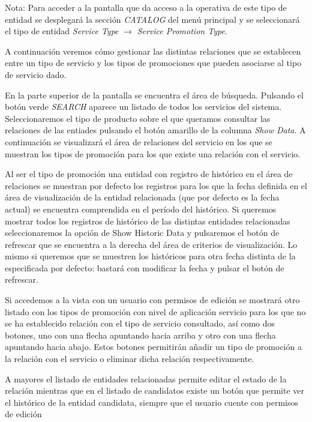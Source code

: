 Nota: Para acceder a la pantalla que da acceso a la operativa de este tipo de entidad se desplegará la sección \emph{CATALOG} del menú principal y se seleccionará el tipo de entidad \emph{Service Type} $\rightarrow$  \emph{Service Promotion Type}.


A continuación veremos cómo gestionar las distintas relaciones que se establecen entre un tipo de servicio y los tipos de promociones que pueden asociarse al tipo de servicio dado.


En la parte superior de la pantalla se encuentra el área de búsqueda. Pulsando el botón verde \emph{SEARCH} aparece un listado de todos los servicios del sistema. Seleccionaremos el tipo de producto sobre el que queramos consultar las relaciones de las entiades pulsando el botón amarillo de la columna \emph{Show Data}. A continuación se visualizará el área de relaciones del servicio en los que se muestran los tipos de promoción para los que existe una relación con el servicio.

Al ser el tipo de promoción una entidad con registro de histórico en el área de relaciones se muestran por defecto los registros para los que la fecha definida en el área de visualización de la entidad relacionada (que por defecto es la fecha actual) se encuentra comprendida en el período del histórico. Si queremos mostrar todos los registros de histórico de las distintas entidades relacionadas seleccionaremos la opción de Show Historic Data y pulsaremos el botón de refrescar que se encuentra a la derecha del área de criterios de visualización. Lo mismo si queremos que se muestren los históricos para otra fecha distinta de la especificada por defecto: bastará con modificar la fecha y pulsar el botón de refrescar.

Si accedemos a la vista con un usuario con permisos de edición se mostrará otro listado con los tipos de promoción con nivel de aplicación servicio para los que no se ha establecido relación con el tipo de servicio consultado, así como dos botones, uno con una flecha apuntando hacia arriba y otro con una flecha apuntando hacia abajo. Estos botones permitirán añadir un tipo de promoción a la relación con el servicio o eliminar dicha relación respectivamente. 

A mayores el listado de entidades relacionadas permite editar el estado de la relación mientras que en el listado de candidatos existe un botón que permite ver el histórico de la entidad candidata, siempre que el usuario cuente con permisos de edición


